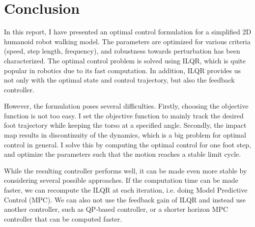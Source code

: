 \section{Conclusion}
\label{sec:conclusion}

In this report, I have presented an optimal control formulation for a simplified 2D humanoid robot walking model. The parameters are optimized for various criteria (speed, step length, frequency), and robustness towards perturbation has been characterized. The optimal control problem is solved using ILQR, which is quite popular in robotics due to its fast computation. In addition, ILQR provides us not only with the optimal state and control trajectory, but also the feedback controller. 

However, the formulation poses several difficulties. Firstly, choosing the objective function is not too easy. I set the objective function to mainly track the desired foot trajectory while keeping the torso at a specified angle. Secondly, the impact map results in discontinuity of the dynamics, which is a big problem for optimal control in general. I solve this by computing the optimal control for one foot step, and optimize the parameters such that the motion reaches a stable limit cycle. 

While the resulting controller performs well, it can be made even more stable by considering several possible approaches. If the computation time can be made faster, we can recompute the ILQR at each iteration, i.e. doing Model Predictive Control (MPC). We can also not use the feedback gain of ILQR and instead use another controller, such as QP-based controller, or a shorter horizon MPC controller that can be computed faster. 





